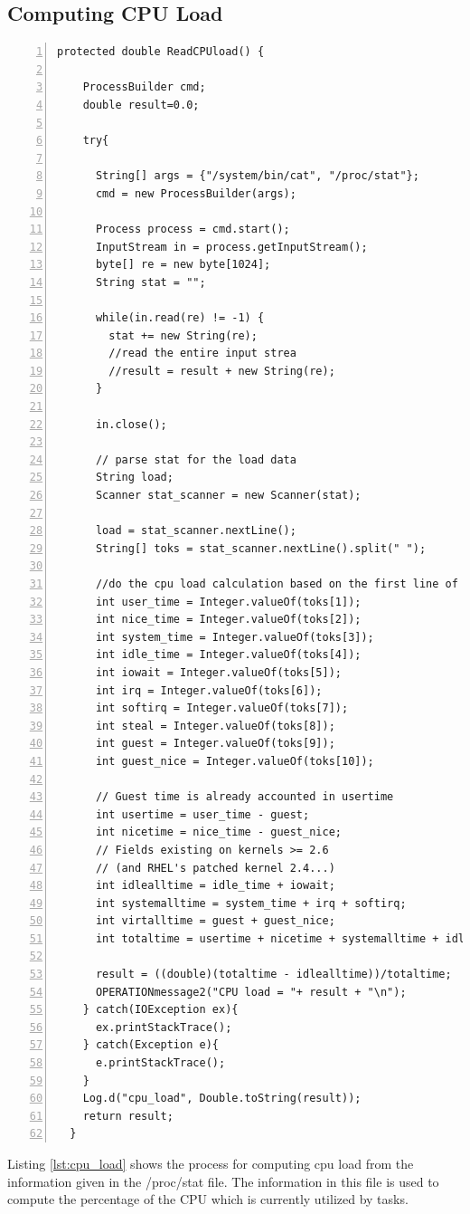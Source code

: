 \documentclass{article} %
\begin{document}
\subsection{Computing CPU Load}
\begin{lstlisting}[caption={Computing CPU Load},label={lst:cpu_load},numbers=left]
protected double ReadCPUload() {

    ProcessBuilder cmd;
    double result=0.0;

    try{

      String[] args = {"/system/bin/cat", "/proc/stat"};
      cmd = new ProcessBuilder(args);

      Process process = cmd.start();
      InputStream in = process.getInputStream();
      byte[] re = new byte[1024];
      String stat = "";

      while(in.read(re) != -1) {
        stat += new String(re);
        //read the entire input strea
        //result = result + new String(re);
      }

      in.close();

      // parse stat for the load data
      String load;
      Scanner stat_scanner = new Scanner(stat);

      load = stat_scanner.nextLine();
      String[] toks = stat_scanner.nextLine().split(" ");

      //do the cpu load calculation based on the first line of /proc/stat
      int user_time = Integer.valueOf(toks[1]);
      int nice_time = Integer.valueOf(toks[2]);
      int system_time = Integer.valueOf(toks[3]);
      int idle_time = Integer.valueOf(toks[4]);
      int iowait = Integer.valueOf(toks[5]);
      int irq = Integer.valueOf(toks[6]);
      int softirq = Integer.valueOf(toks[7]);
      int steal = Integer.valueOf(toks[8]);
      int guest = Integer.valueOf(toks[9]);
      int guest_nice = Integer.valueOf(toks[10]);

      // Guest time is already accounted in usertime
      int usertime = user_time - guest;
      int nicetime = nice_time - guest_nice;
      // Fields existing on kernels >= 2.6
      // (and RHEL's patched kernel 2.4...)
      int idlealltime = idle_time + iowait;
      int systemalltime = system_time + irq + softirq;
      int virtalltime = guest + guest_nice;
      int totaltime = usertime + nicetime + systemalltime + idlealltime + steal + virtalltime;

      result = ((double)(totaltime - idlealltime))/totaltime;
      OPERATIONmessage2("CPU load = "+ result + "\n");
    } catch(IOException ex){
      ex.printStackTrace();
    } catch(Exception e){
      e.printStackTrace();
    }
    Log.d("cpu_load", Double.toString(result));
    return result;
  }
\end{lstlisting}
Listing \ref{lst:cpu_load} shows the process for computing cpu load from the information given in the /proc/stat file. The information in this file is used to compute the percentage of the CPU which is currently utilized by tasks.
\end{document}
